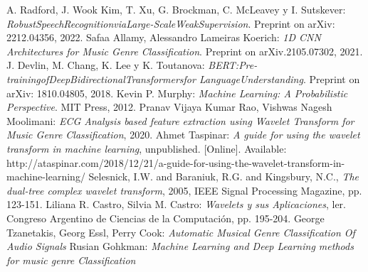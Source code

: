 \documentclass[colorinlistoftodos,twoside,twocolumn,10pt]{article} %
\begin{document}
	    
	\begin{thebibliography}{20}
		 A. Radford, J. Wook Kim, T. Xu, G. Brockman, C. McLeavey y I. Sutskever: \emph{RobustSpeechRecognitionviaLarge-ScaleWeakSupervision}. Preprint on arXiv: 2212.04356, 2022. 	
		 Safaa Allamy, Alessandro Lameiras Koerich: \emph{1D CNN Architectures for Music Genre Classification}. Preprint on arXiv.2105.07302, 2021. 
		 J. Devlin, M. Chang, K. Lee y K. Toutanova: \emph{BERT:Pre-trainingofDeepBidirectionalTransformersfor LanguageUnderstanding}. Preprint on arXiv: 1810.04805, 2018. 
		 Kevin P. Murphy: \emph{Machine Learning: A Probabilistic Perspective}. MIT Press, 2012.
		 Pranav Vijaya Kumar Rao, Vishwas Nagesh Moolimani: \emph{ECG Analysis based feature extraction using Wavelet Transform for Music Genre Classification}, 2020. 
		 Ahmet Taspinar: \emph{A guide for using the wavelet transform in machine learning}, unpublished. [Online]. Available: http://ataspinar.com/2018/12/21/a-guide-for-using-the-wavelet-transform-in-machine-learning/
		 Selesnick, I.W. and Baraniuk, R.G. and Kingsbury, N.C., \emph{The dual-tree complex wavelet transform}, 2005, IEEE Signal Processing Magazine, pp. 123-151.
		 Liliana R. Castro, Silvia M.  Castro: \emph{Wavelets y sus Aplicaciones}, ler. Congreso Argentino de Ciencias de la Computación, pp. 195-204.
		 George Tzanetakis, Georg Essl, Perry Cook: \emph{Automatic Musical Genre Classification Of Audio Signals}
		 Rusian Gohkman: \emph{Machine Learning and Deep Learning methods for music genre Classification}
    \end{thebibliography}
	
\end{document}
